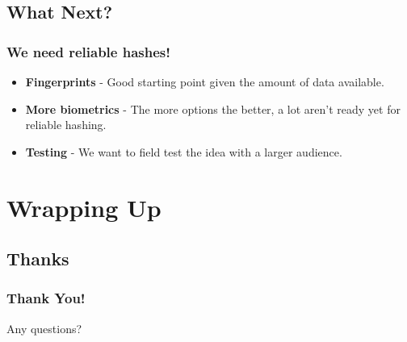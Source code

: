 \documentclass{beamer}
\begin{document}
    \subsection{What Next?}
      \begin{frame}
        \frametitle{We need reliable hashes!}
        \begin{itemize}
          \item \textbf{Fingerprints} - Good starting point given the amount of
                data available.
          \item \textbf{More biometrics} - The more options the better, a lot
                aren't ready yet for reliable hashing.
          \item \textbf{Testing} - We want to field test the idea with a larger
                audience.
        \end{itemize}
      \end{frame}
  \section{Wrapping Up}
    \subsection{Thanks}
      \begin{frame}
        \frametitle{Thank You!}
        Any questions?
      \end{frame}
\end{document}

